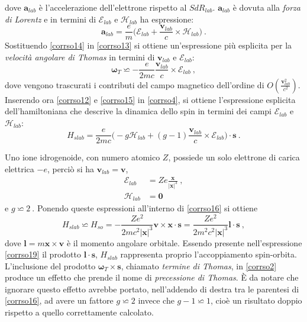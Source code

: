 \documentclass[12pt,a4paper]{report}
\numberwithin{equation}{section}
\numberwithin{section}{chapter}
\begin{document}
	dove $\boldsymbol{a}_{lab}$ \`e l'accelerazione dell'elettrone rispetto al $SdR_{lab}$. $\boldsymbol{a}_{lab}$ \`e dovuta alla \textit{forza di Lorentz} e in termini di $\boldsymbol{\mathcal{E}}_{lab}$ e $\boldsymbol{\mathcal{H}}_{lab}$ ha espressione:
	\begin{equation}
	\label{corrso14}
	\boldsymbol{a}_{lab} = \frac{e}{m}\bigg(\boldsymbol{\mathcal{E}}_{lab} + \frac{\boldsymbol{v}_{lab}}{c} \times \boldsymbol{\mathcal{H}}_{lab}\bigg)~.
	\end{equation}
	Sostituendo \eqref{corrso14} in \eqref{corrso13} si ottiene un'espressione pi\`u esplicita per la \textit{velocit\`a angolare di Thomas} in termini di $\boldsymbol{v}_{lab}$ e $\boldsymbol{\mathcal{E}}_{lab}$:
	\begin{equation}
	\label{corrso15}
	\boldsymbol{\omega}_T \backsimeq -\frac{e}{2mc}\frac{\boldsymbol{v}_{lab}}{c} \times \boldsymbol{\mathcal{E}}_{lab}~, 
	\end{equation}
	dove vengono trascurati i contributi del campo magnetico dell'ordine di $O(\frac{\boldsymbol{v}_{lab}^2}{c^2})$.
	Inserendo ora \eqref{corrso12} e \eqref{corrso15} in \eqref{corrso4}, si ottiene l'espressione esplicita dell'hamiltoniana che descrive la dinamica dello spin in termini dei campi $\boldsymbol{\mathcal{E}}_{lab}$ e $\boldsymbol{\mathcal{H}}_{lab}$:
	\begin{equation}
	\label{corrso16}
	H_{slab} = \frac{e}{2mc}\bigg(- g\boldsymbol{\mathcal{H}}_{lab} + (g-1)\frac{\boldsymbol{v}_{lab}}{c} \times \boldsymbol{\mathcal{E}}_{lab} \bigg) \cdot \boldsymbol{s}~.
	\end{equation}
	
	Uno ione idrogenoide, con numero atomico $Z$, possiede un solo elettrone di carica elettrica $-e$, perci\`o si ha $\boldsymbol{v}_{lab} = \boldsymbol{v}$,
	\begin{align}
	\boldsymbol{\mathcal{E}}_{lab}& = Ze\frac{\boldsymbol{x}}{|\boldsymbol{x}|^3}~,\label{corrso17}\\
	\boldsymbol{\mathcal{H}}_{lab}& = \boldsymbol{0}~\label{corrso18}
	\end{align}
	e $g \backsimeq 2~$. Ponendo queste espressioni all'interno di \eqref{corrso16} si ottiene
	\begin{equation}
	\label{corrso19}
	H_{slab} \backsimeq H_{so} = - \frac{Ze^2}{2mc^2|\boldsymbol{x}|^3}\boldsymbol{v} \times \boldsymbol{x} \cdot \boldsymbol{s} = \frac{Ze^2}{2m^2c^2|\boldsymbol{x}|^3}\boldsymbol{l} \cdot \boldsymbol{s}~,
	\end{equation}
	dove $\boldsymbol{l} = m\boldsymbol{x}\times\boldsymbol{v}$ \`e il momento angolare orbitale. Essendo presente nell'espressione \eqref{corrso19} il prodotto $\boldsymbol{l} \cdot \boldsymbol{s}$, $H_{slab}$ rappresenta proprio l'accoppiamento spin-orbita. L'inclusione del prodotto $\boldsymbol{\omega}_T \times \boldsymbol{s}$, chiamato \textit{termine di Thomas}, in \eqref{corrso2} produce un effetto che prende il nome di \textit{precessione di Thomas}. \`E da notare che ignorare questo effetto avrebbe portato, nell'addendo di destra tra le parentesi di \eqref{corrso16}, ad avere un fattore $g \backsimeq 2$ invece che $g-1 \backsimeq 1$, cio\`e un risultato doppio rispetto a quello correttamente calcolato. 
	
\end{document}
